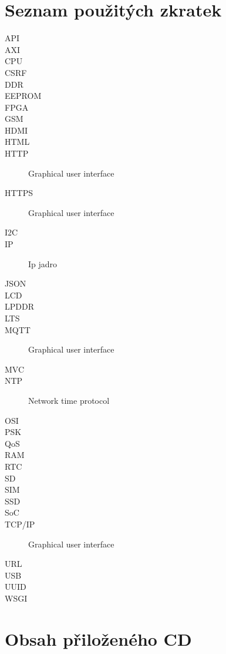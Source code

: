 \documentclass[thesis=M,czech]{templates/FITthesis}[2012/06/26]
\begin{document}
\chapter{Seznam použitých zkratek}
\begin{description}
	\item[API]
    \item[AXI]
    \item[CPU]
    \item[CSRF]
    \item[DDR]
    \item[EEPROM]
    \item[FPGA]
    \item[GSM]
    \item[HDMI]
    \item[HTML]
	\item[HTTP] Graphical user interface
    \item[HTTPS] Graphical user interface
    \item[I2C]
    \item[IP] Ip jadro
    \item[JSON]
    \item[LCD]
    \item[LPDDR]
    \item[LTS]
    \item[MQTT] Graphical user interface
    \item[MVC]
    \item[NTP] Network time protocol
    \item[OSI]
    \item[PSK]
    \item[QoS]
    \item[RAM]
    \item[RTC]
    \item[SD]
    \item[SIM]
    \item[SSD]
    \item[SoC]
    \item[TCP/IP] Graphical user interface
    \item[URL]
    \item[USB]
    \item[UUID]
    \item[WSGI]
\end{description}

\chapter{Obsah přiloženého CD}

\begin{figure}
\end{figure}
\end{document}
